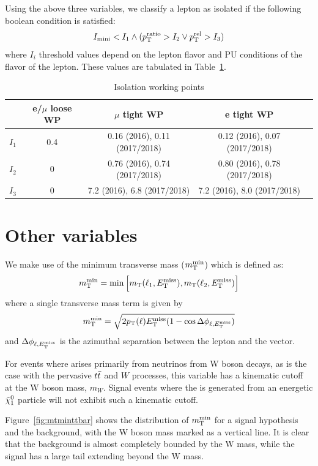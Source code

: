 Using the above three variables, we classify a lepton
as isolated if the following boolean condition is satisfied:
\begin{equation}
  I_\mathrm{mini} < I_1 \wedge ( p_{\mathrm{T}}^\text{ratio} > I_2 \vee p_{\mathrm{T}}^\text{rel} > I_3 )
\end{equation}
where $I_i$ threshold values depend on the lepton flavor and PU conditions
of the flavor of the lepton. These values are tabulated in Table~\ref{tab:isoWPs}.

\begin{table}[h]
    \label{tab:isoWPs}
    \centering
    \caption{Isolation working points }
    \begin{tabular}{|l||c|c|c|c|}
        \hline
        & e/$\mu$ loose WP &  $\mu$ tight WP & e tight WP \\ \hline 
        $I_1$ & 0.4 & 0.16 (2016), 0.11 (2017/2018) & 0.12 (2016), 0.07 (2017/2018) \\
        $I_2$ & 0  & 0.76 (2016), 0.74 (2017/2018) & 0.80 (2016), 0.78 (2017/2018) \\
        $I_3$ & 0  & 7.2 (2016), 6.8 (2017/2018) & 7.2 (2016), 8.0 (2017/2018) \\ \hline
    \end{tabular}
\end{table}

\section{Other variables}

We make use of the minimum transverse mass ($m_{\mathrm{T}}^{\text{min}}$) which is defined as:
\begin{equation}
    m_{\mathrm{T}}^{\text{min}} = \mathrm{min}\left[ m_{\mathrm{T}}(\ell_1, E_{\mathrm{T}}^{\text{miss}}), m_{\mathrm{T}}(\ell_2, E_{\mathrm{T}}^{\text{miss}})\right ]
\end{equation}
where a single transverse mass term is given by
\begin{equation}
    m_{\mathrm{T}}^{\text{min}} = \sqrt{2p_{\mathrm{T}}(\ell) E_{\mathrm{T}}^{\text{miss}} (1-\cos\Delta \phi_{\ell,E_{\mathrm{T}}^{\text{miss}}})}
\end{equation}
and $\Delta \phi_{\ell,E_{\mathrm{T}}^{\text{miss}}}$ is the azimuthal separation between the lepton
and the \ptmiss vector.

For events where \ptmiss arises primarily from neutrinos from W boson decays,
as is the case with the pervasive $t\bar{t}$ and $W$ processes, this variable
has a kinematic cutoff at the W boson mass, $m_{W}$. Signal events
where the \ptmiss is generated from an energetic $\tilde{\chi}_1^0$ particle
will not exhibit such a kinematic cutoff.

Figure~\ref{fig:mtminttbar} shows the distribution of $m_{\mathrm{T}}^{\text{min}}$ for a signal hypothesis \Totttt and the
\ttbar background, with the W boson mass marked as a vertical line. It is clear that 
the \ttbar background is almost completely bounded by the W mass, while the signal has a
large tail extending beyond the W mass.

